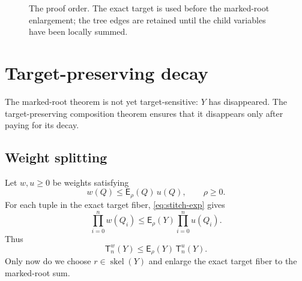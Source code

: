 \documentclass[11pt]{article}
\newcommand{\skel}{\operatorname{skel}}
\newcommand{\ExpW}{\mathsf E}
\newcommand{\TargetTerm}{\mathsf T}
\begin{document}
\begin{figure}[t]
\centering
{}
\caption{The proof order.  The exact target is used before the marked-root enlargement; the tree edges are retained until the child variables have been locally summed.}
\label{fig:pipeline}
\end{figure}

\section{Target-preserving decay}

The marked-root theorem is not yet target-sensitive: $Y$ has disappeared.  The target-preserving composition theorem ensures that it disappears only after paying for its decay.

\subsection{Weight splitting}

Let $w,u\ge0$ be weights satisfying
\begin{equation}\label{eq:split}
  w(Q)\le \ExpW_\rho(Q)\,u(Q),
  \qquad \rho\ge0.
\end{equation}
For each tuple in the exact target fiber, \cref{eq:stitch-exp} gives
\[
  \prod_{i=0}^{n}w(Q_i)
  \le
  \ExpW_\rho(Y)\prod_{i=0}^{n}u(Q_i).
\]
Thus
\begin{equation}\label{eq:target-extract}
  \TargetTerm_n^w(Y)
  \le
  \ExpW_\rho(Y)\,\TargetTerm_n^u(Y).
\end{equation}
Only now do we choose $r\in\skel(Y)$ and enlarge the exact target fiber to the marked-root sum.
\end{document}
